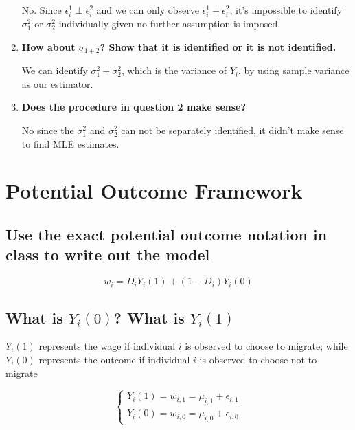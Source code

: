 \documentclass[11pt]{article}
\begin{document}
\begin{enumerate}
                No. Since $\epsilon_i^1 \perp \epsilon_i^2$ and we can only observe $\epsilon_i^1 + \epsilon_i^2$, it's impossible to identify $\sigma_1^2$ or $\sigma_2^2$ individually given no further assumption is imposed.

            \item{\bf How about $\sigma_{1+2}$? Show that it is identified or it is not identified.}

                We can identify $\sigma_1^2 + \sigma_2^2$, which is the variance of $Y_i$, by using sample variance as our estimator.

            \item{\bf Does the procedure in question 2 make sense?}

                No since the $\sigma_1^2$ and $\sigma_2^2$ can not be separately identified, it didn't make sense to find MLE estimates.

        \end{enumerate}    



\section{Potential Outcome Framework}

    \subsection{Use the exact potential outcome notation in class to write out the model}
    
        \[
            w_i = D_iY_i(1) + (1-D_i)Y_i(0)
        \]
    
    \subsection{What is $Y_i(0)$? What is $Y_i(1)$} 
    
        $Y_i(1)$ represents the wage if individual $i$ is observed to choose to migrate; while $Y_i(0)$ represents the outcome if individual $i$ is observed to choose not to migrate

        \[ \left\{ \begin{aligned} 
            Y_i(1) = w_{i,1} = \mu_{i,1} + \epsilon_{i,1} \\
            Y_i(0) = w_{i,0} = \mu_{i,0} + \epsilon_{i,0}
        \end{aligned} \right. \]
\end{document}
